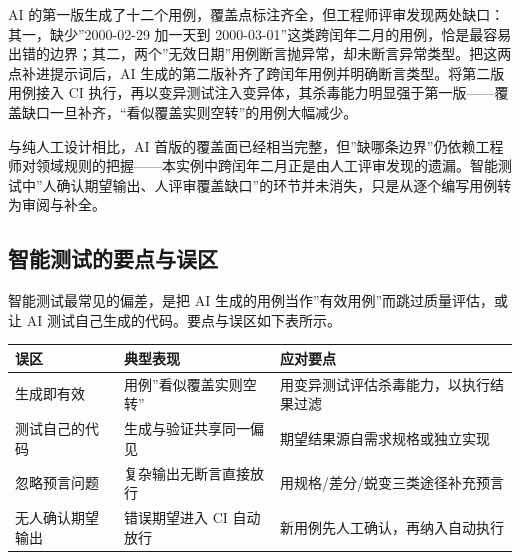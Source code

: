 \documentclass[
]{ctexbook}
\newcounter{none}
\begin{document}
AI
的第一版生成了十二个用例，覆盖点标注齐全，但工程师评审发现两处缺口：其一，缺少''2000-02-29
加一天到
2000-03-01''这类跨闰年二月的用例，恰是最容易出错的边界；其二，两个''无效日期''用例断言抛异常，却未断言异常类型。把这两点补进提示词后，AI
生成的第二版补齐了跨闰年用例并明确断言类型。将第二版用例接入 CI
执行，再以变异测试注入变异体，其杀毒能力明显强于第一版------覆盖缺口一旦补齐，``看似覆盖实则空转''的用例大幅减少。

与纯人工设计相比，AI
首版的覆盖面已经相当完整，但''缺哪条边界''仍依赖工程师对领域规则的把握------本实例中跨闰年二月正是由人工评审发现的遗漏。智能测试中''人确认期望输出、人评审覆盖缺口''的环节并未消失，只是从逐个编写用例转为审阅与补全。

\subsection{智能测试的要点与误区}\label{ux667aux80fdux6d4bux8bd5ux7684ux8981ux70b9ux4e0eux8befux533a}

智能测试最常见的偏差，是把 AI
生成的用例当作''有效用例''而跳过质量评估，或让 AI
测试自己生成的代码。要点与误区如下表所示。

{\def\LTcaptype{none} %
\begin{longtable}[]{@{}
  >{\raggedright\arraybackslash}p{}
  >{\raggedright\arraybackslash}p{}
  >{\raggedright\arraybackslash}p{}@{}}
\toprule\noalign{}
\begin{minipage}[b]{\linewidth}\raggedright
误区
\end{minipage} & \begin{minipage}[b]{\linewidth}\raggedright
典型表现
\end{minipage} & \begin{minipage}[b]{\linewidth}\raggedright
应对要点
\end{minipage} \\
\midrule\noalign{}
\endhead
\bottomrule\noalign{}
\endlastfoot
生成即有效 & 用例''看似覆盖实则空转'' &
用变异测试评估杀毒能力，以执行结果过滤 \\
测试自己的代码 & 生成与验证共享同一偏见 &
期望结果源自需求规格或独立实现 \\
忽略预言问题 & 复杂输出无断言直接放行 &
用规格/差分/蜕变三类途径补充预言 \\
无人确认期望输出 & 错误期望进入 CI 自动放行 &
新用例先人工确认，再纳入自动执行 \\
\end{longtable}
}
\end{document}
